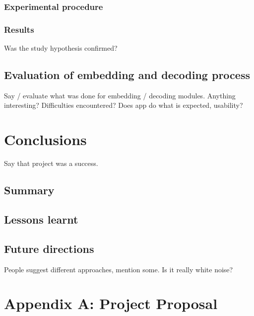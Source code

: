 \documentclass[12pt,british,twoside,notitlepage,usenames,dvipsnames,hypens,final]{report}
\numberwithin{equation}{section}
\numberwithin{figure}{section}
\begin{document}
\subsection{Experimental procedure}

\subsection{Results}

Was the study hypothesis confirmed?

\section{Evaluation of embedding and decoding process}

Say / evaluate what was done for embedding / decoding modules. Anything interesting? Difficulties encountered? Does app do what is expected, usability?

\cleardoublepage
\chapter{Conclusions}

Say that project was a success.

\section{Summary}

\section{Lessons learnt}

\section{Future directions}

People suggest different approaches, mention some. Is it really white noise?

\cleardoublepage



\appendix
\cleardoublepage
{}
\chapter*{Appendix A: Project Proposal}


\end{document}
